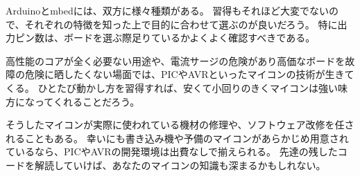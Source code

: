 \documentclass[letterpaper,10pt,dvipdfmx]{sphinxmanual}
\begin{document}
Arduinoとmbedには、双方に様々種類がある。
習得もそれほど大変でないので、それぞれの特徴を知った上で目的に合わせて選ぶのが良いだろう。
特に出力ピン数は、ボードを選ぶ際足りているかよくよく確認すべきである。

高性能のコアが全く必要ない用途や、電流サージの危険があり高価なボードを故障の危険に晒したくない場面では、PICやAVRといったマイコンの技術が生きてくる。
ひとたび動かし方を習得すれば、安くて小回りのきくマイコンは強い味方になってくれることだろう。

そうしたマイコンが実際に使われている機材の修理や、ソフトウェア改修を任されることもある。
幸いにも書き込み機や予備のマイコンがあらかじめ用意されているなら、PICやAVRの開発環境は出費なしで揃えられる。
先達の残したコードを解読していけば、あなたのマイコンの知識も深まるかもしれない。



\renewcommand{\indexname}{索引}
\printindex
\end{document}
